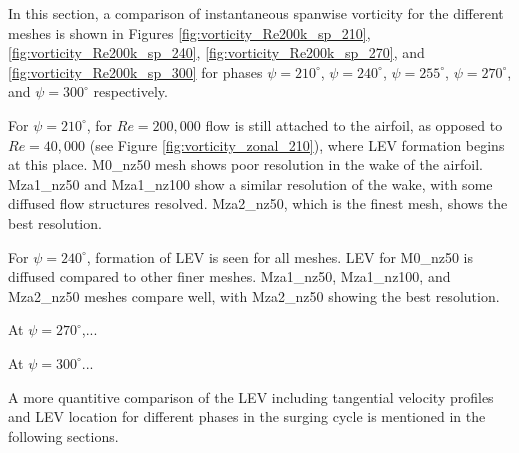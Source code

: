 In this section, a comparison of instantaneous spanwise vorticity for the different meshes is shown in Figures \ref{fig:vorticity_Re200k_sp_210}, \ref{fig:vorticity_Re200k_sp_240},  \ref{fig:vorticity_Re200k_sp_270}, and \ref{fig:vorticity_Re200k_sp_300} for phases $\psi=210^\circ$, $\psi=240^\circ$, $\psi=255^\circ$, $\psi=270^\circ$, and $\psi=300^\circ$ respectively. 

For $\psi=210^\circ$, for $Re=200,000$ flow is still attached to the airfoil, as opposed to $Re=40,000$ (see Figure \ref{fig:vorticity_zonal_210}), where LEV formation begins at this place.
M0\_nz50 mesh shows poor resolution in the wake of the airfoil.
Mza1\_nz50 and Mza1\_nz100 show a similar resolution of the wake, with some diffused flow structures resolved.
Mza2\_nz50, which is the finest mesh, shows the best resolution. 

For $\psi=240^\circ$, formation of LEV is seen for all meshes.
LEV for M0\_nz50 is diffused compared to other finer meshes.
Mza1\_nz50, Mza1\_nz100, and Mza2\_nz50 meshes compare well, with Mza2\_nz50 showing the best resolution.


At $\psi=270^\circ$,...


At $\psi=300^\circ$...

A more quantitive comparison of the LEV including tangential velocity profiles and LEV location for different phases in the surging cycle is mentioned in the following sections.



